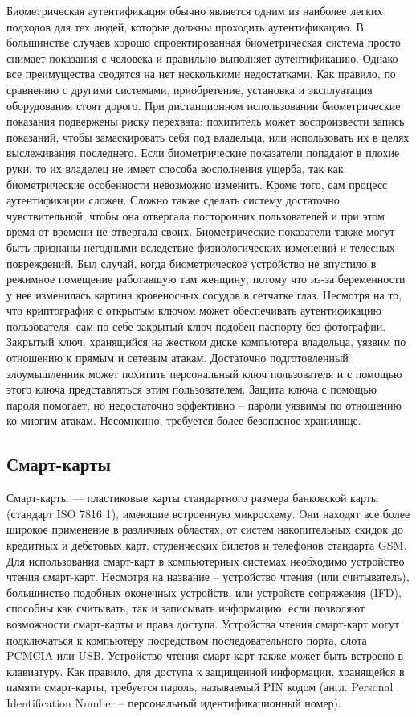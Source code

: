 Биометрическая аутентификация обычно является одним из наиболее легких подходов
для тех людей, которые должны проходить аутентификацию. В большинстве случаев
хорошо спроектированная биометрическая система просто снимает показания с
человека и правильно выполняет аутентификацию. Однако все преимущества сводятся
на нет несколькими недостатками. Как правило, по сравнению с другими системами,
приобретение, установка и эксплуатация оборудования стоят дорого. При
дистанционном использовании биометрические показания подвержены риску перехвата:
похититель может воспроизвести запись показаний, чтобы замаскировать себя под
владельца, или использовать их в целях выслеживания последнего. Если
биометрические показатели попадают в плохие руки, то их владелец не имеет
способа восполнения ущерба, так как биометрические особенности невозможно
изменить. Кроме того, сам процесс аутентификации сложен. Сложно также сделать
систему достаточно чувствительной, чтобы она отвергала посторонних пользователей
и при этом время от времени не отвергала своих. Биометрические показатели также
могут быть признаны негодными вследствие физиологических изменений и телесных
повреждений. Был случай, когда биометрическое устройство не впустило в режимное
помещение работавшую там женщину, потому что из-за беременности у нее изменилась
картина кровеносных сосудов в сетчатке глаз. Несмотря на то, что криптография с
открытым ключом может обеспечивать аутентификацию пользователя, сам по себе
закрытый ключ подобен паспорту без фотографии. Закрытый ключ, хранящийся на
жестком диске компьютера владельца, уязвим по отношению к прямым и сетевым
атакам. Достаточно подготовленный злоумышленник может похитить персональный ключ
пользователя и с помощью этого ключа представляться этим пользователем. Защита
ключа с помощью пароля помогает, но недостаточно эффективно -- пароли уязвимы по
отношению ко многим атакам. Несомненно, требуется более безопасное хранилище.

\subsection{Смарт-карты}

Смарт-карты --- пластиковые карты стандартного размера банковской карты
(стандарт ISO 7816 1), имеющие встроенную микросхему. Они находят все более широкое
применение в различных областях, от систем накопительных скидок до кредитных и
дебетовых карт, студенческих билетов и телефонов стандарта GSM. Для
использования смарт-карт в компьютерных системах необходимо устройство чтения
смарт-карт. Несмотря на название -- устройство чтения (или считыватель),
большинство подобных оконечных устройств, или устройств сопряжения (IFD),
способны как считывать, так и записывать информацию, если позволяют возможности
смарт-карты и права доступа. Устройства чтения смарт-карт могут подключаться к
компьютеру посредством последовательного порта, слота PCMCIA или USB. Устройство
чтения смарт-карт также может быть встроено в клавиатуру. Как правило, для
доступа к защищенной информации, хранящейся в памяти смарт-карты, требуется
пароль, называемый PIN кодом (англ. Personal Identification Number --
персональный идентификационный номер).~\cite{thesis_smart_card}

